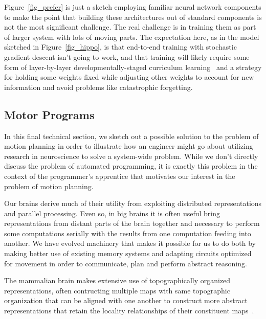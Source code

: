\documentclass[letterpaper,11pt]{article}
\def\urlh#1{{}}
\begin{document}
Figure~{\urlh{#fig_Prefrontal_Hierarchy_Biology_Technology}{\ref{fig_prefer}}} is just a sketch employing familiar neural network components to make the point that building these architectures out of standard components is not the most significant challenge. The real challenge is in training them as part of larger system with lots of moving parts. The expectation here, as in the model sketched in Figure~{\urlh{#fig_Hippocampus_Inspired_Learning_Redux}{\ref{fig_hippo}}}, is that end-to-end training with stochastic gradient descent isn't going to work, and that training will likely require some form of layer-by-layer developmentally-staged curriculum learning~\cite{LampinenetalCoRR-19,GulcehreetalCoRR-16,BengioetalCoRR-15,BengioetalICML-09} and a strategy for holding some weights fixed while adjusting other weights to account for new information and avoid problems like catastrophic forgetting.



\subsection{Motor Programs}

In this final technical section, we sketch out a possible solution to the problem of motion planning in order to illustrate how an engineer might go about utilizing research in neuroscience to solve a system-wide problem. While we don't directly discuss the problem of automated programming, it is exactly this problem in the context of the programmer's apprentice that motivates our interest in the problem of motion planning.

Our brains derive much of their utility from exploiting distributed representations and parallel processing. Even so, in big brains it is often useful bring representations from distant parts of the brain together and necessary to perform some computations serially with the results from one computation feeding into another. We have evolved machinery that makes it possible for us to do both by making better use of existing memory systems and adapting circuits optimized for movement in order to communicate, plan and perform abstract reasoning.

The mammalian brain makes extensive use of topographically organized representations, often contructing multiple maps with same topographic organization that can be aligned with one another to construct more abstract representations that retain the locality relationships of their constituent maps~\cite{WandelletalNEURON-07,WandelletalPTRS-B-05}. 
\end{document}
